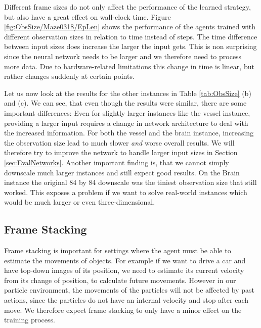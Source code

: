 Different frame sizes do not only affect the performance of the learned strategy, but also have a great effect on wall-clock time. Figure \ref{fig:ObsSize/Maze0318/EpLen} shows the performance of the agents trained with different observation sizes in relation to time instead of steps. The time difference between input sizes does increase the larger the input gets. This is non surprising since the neural network needs to be larger and we therefore need to process more data. Due to hardware-related limitations this change in time is linear, but rather changes suddenly at certain points.

Let us now look at the results for the other instances in Table \ref{tab:ObsSize} (b) and (c). We can see, that even though the results were similar, there are some important differences: Even for slightly larger instances like the vessel instance, providing a larger input requires a change in network architecture to deal with the increased information. For both the vessel and the brain instance, increasing the observation size lead to much slower \textit{and} worse overall results. We will therefore try to improve the network to handle larger input sizes in Section \ref{sec:EvalNetworks}. Another important finding is, that we cannot simply downscale much larger instances and still expect good results. On the Brain instance the original 84 by 84 downscale was the tiniest observation size that still worked. This exposes a problem if we want to solve real-world instances which would be much larger or even three-dimensional. 


\subsection{Frame Stacking} \label{sec:Eval/FrameStack}
Frame stacking is important for settings where the agent must be able to estimate the movements of objects. For example if we want to drive a car and have top-down images of its position, we need to estimate its current velocity from its change of position, to calculate future movements. However in our particle environment, the movements of the particles will not be affected by past actions, since the particles do not have an internal velocity and stop after each move. We therefore expect frame stacking to only have a minor effect on the training process.   

